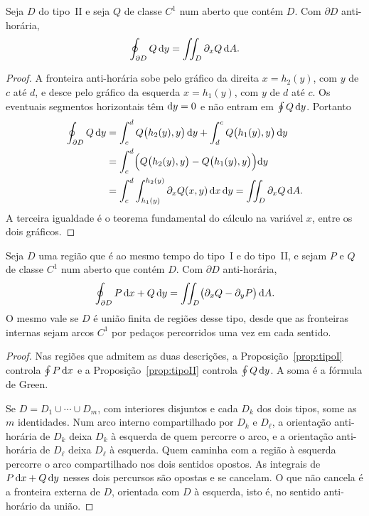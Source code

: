 \documentclass[11pt,a4paper]{article}
\begin{document}
\begin{proposicao}
\label{prop:tipoII}
Seja $D$ do tipo~II e seja $Q$ de classe $C^1$ num aberto que contém $D$. Com $\partial D$ anti-horária,
\[
\oint_{\partial D} Q\,\mathrm{d} y=\iint_D \partial_x Q\,\mathrm{d} A.
\]
\end{proposicao}

\begin{proof}
A fronteira anti-horária sobe pelo gráfico da direita $x=h_2(y)$, com $y$ de $c$ até $d$, e desce pelo gráfico da esquerda $x=h_1(y)$, com $y$ de $d$ até $c$. Os eventuais segmentos horizontais têm $\mathrm{d} y=0$ e não entram em $\oint Q\,\mathrm{d} y$. Portanto
\begin{align*}
\oint_{\partial D} Q\,\mathrm{d} y
&=\int_c^d Q\bigl(h_2(y),y\bigr)\,\mathrm{d} y+\int_d^c Q\bigl(h_1(y),y\bigr)\,\mathrm{d} y\\
&=\int_c^d\Bigl(Q\bigl(h_2(y),y\bigr)-Q\bigl(h_1(y),y\bigr)\Bigr)\mathrm{d} y\\
&=\int_c^d\int_{h_1(y)}^{h_2(y)}\partial_x Q(x,y)\,\mathrm{d} x\,\mathrm{d} y
=\iint_D\partial_x Q\,\mathrm{d} A.
\end{align*}
A terceira igualdade é o teorema fundamental do cálculo na variável $x$, entre os dois gráficos.
\end{proof}

\begin{teorema}
\label{thm:green}
Seja $D$ uma região que é ao mesmo tempo do tipo~I e do tipo~II, e sejam $P$ e $Q$ de classe $C^1$ num aberto que contém $D$. Com $\partial D$ anti-horária,
\[
\oint_{\partial D} P\,\mathrm{d} x+Q\,\mathrm{d} y
=\iint_D\bigl(\partial_x Q-\partial_y P\bigr)\,\mathrm{d} A.
\]
O mesmo vale se $D$ é união finita de regiões desse tipo, desde que as fronteiras internas sejam arcos $C^1$ por pedaços percorridos uma vez em cada sentido.
\end{teorema}

\begin{proof}
Nas regiões que admitem as duas descrições, a Proposição~\ref{prop:tipoI} controla $\oint P\,\mathrm{d} x$ e a Proposição~\ref{prop:tipoII} controla $\oint Q\,\mathrm{d} y$. A soma é a fórmula de Green.

Se $D=D_1\cup\cdots\cup D_m$, com interiores disjuntos e cada $D_k$ dos dois tipos, some as $m$ identidades. Num arco interno compartilhado por $D_k$ e $D_\ell$, a orientação anti-horária de $D_k$ deixa $D_k$ à esquerda de quem percorre o arco, e a orientação anti-horária de $D_\ell$ deixa $D_\ell$ à esquerda. Quem caminha com a região à esquerda percorre o arco compartilhado nos dois sentidos opostos. As integrais de $P\,\mathrm{d} x+Q\,\mathrm{d} y$ nesses dois percursos são opostas e se cancelam. O que não cancela é a fronteira externa de $D$, orientada com $D$ à esquerda, isto é, no sentido anti-horário da união.
\end{proof}
\end{document}
